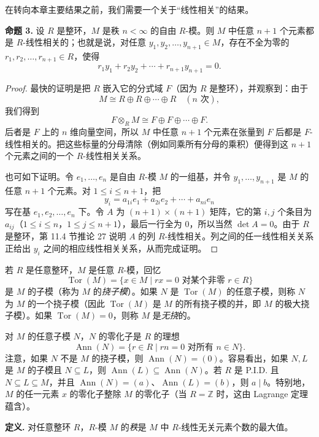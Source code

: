 在转向本章主要结果之前，我们需要一个关于“线性相关”的结果。

\noindent\textbf{命题 3.} 设 $R$ 是整环，$M$ 是秩 $n<\infty$ 的自由 $R$-模。则 $M$ 中任意 $n+1$ 个元素都是 $R$-线性相关的；也就是说，对任意 $y_1,y_2,\ldots,y_{n+1}\in M$，存在不全为零的 $r_1,r_2,\ldots,r_{n+1}\in R$，使得
\[
r_1y_1+r_2y_2+\cdots+r_{n+1}y_{n+1}=0.
\]

\begin{proof}
最快的证明是把 $R$ 嵌入它的分式域 $F$（因为 $R$ 是整环），并观察到：由于
\[
M\cong R\oplus R\oplus\cdots\oplus R\quad(n\text{ 次}),
\]
我们得到
\[
F\otimes_R M\cong F\oplus F\oplus\cdots\oplus F.
\]
后者是 $F$ 上的 $n$ 维向量空间，所以 $M$ 中任意 $n+1$ 个元素在张量到 $F$ 后都是 $F$-线性相关的。把这些标量的分母清除（例如同乘所有分母的乘积）便得到这 $n+1$ 个元素之间的一个 $R$-线性相关关系。

也可如下证明。令 $e_1,\ldots,e_n$ 是自由 $R$-模 $M$ 的一组基，并令 $y_1,\ldots,y_{n+1}$ 是 $M$ 的任意 $n+1$ 个元素。对 $1\leq i\leq n+1$，把
\[
y_i=a_{1i}e_1+a_{2i}e_2+\cdots+a_{ni}e_n
\]
写在基 $e_1,e_2,\ldots,e_n$ 下。令 $A$ 为 $(n+1)\times(n+1)$ 矩阵，它的第 $i,j$ 个条目为 $a_{ij}$（$1\leq i\leq n$，$1\leq j\leq n+1$），最后一行全为 $0$，所以当然 $\det A=0$。由于 $R$ 是整环，第 11.4 节推论 27 说明 $A$ 的列 $R$-线性相关。列之间的任一线性相关关系正给出 $y_i$ 之间的相应线性相关关系，从而完成证明。
\end{proof}

若 $R$ 是任意整环，$M$ 是任意 $R$-模，回忆
\[
\operatorname{Tor}(M)=\{x\in M\mid rx=0\text{ 对某个非零 }r\in R\}
\]
是 $M$ 的子模（称为 $M$ 的\emph{挠子模}）。如果 $N$ 是 $\operatorname{Tor}(M)$ 的任意子模，则称 $N$ 为 $M$ 的一个挠子模（因此 $\operatorname{Tor}(M)$ 是 $M$ 的所有挠子模的并，即 $M$ 的极大挠子模）。如果 $\operatorname{Tor}(M)=0$，则称 $M$ 是\emph{无挠}的。

对 $M$ 的任意子模 $N$，$N$ 的零化子是 $R$ 的理想
\[
\operatorname{Ann}(N)=\{r\in R\mid rn=0\text{ 对所有 }n\in N\}.
\]
注意，如果 $N$ 不是 $M$ 的挠子模，则 $\operatorname{Ann}(N)=(0)$。容易看出，如果 $N,L$ 是 $M$ 的子模且 $N\subseteq L$，则 $\operatorname{Ann}(L)\subseteq \operatorname{Ann}(N)$。若 $R$ 是 P.I.D. 且 $N\subseteq L\subseteq M$，并且 $\operatorname{Ann}(N)=(a)$、$\operatorname{Ann}(L)=(b)$，则 $a\mid b$。特别地，$M$ 的任一元素 $x$ 的零化子整除 $M$ 的零化子（当 $R=\mathbb Z$ 时，这由 Lagrange 定理蕴含）。

\noindent\textbf{定义.} 对任意整环 $R$，$R$-模 $M$ 的\emph{秩}是 $M$ 中 $R$-线性无关元素个数的最大值。

